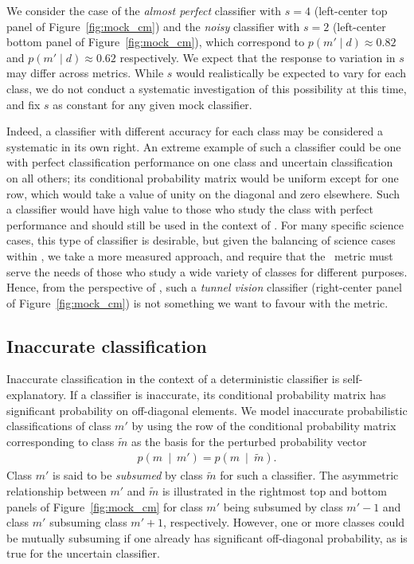 We consider the case of the \textit{almost perfect} classifier with $s=4$ (left-center top panel of Figure~\ref{fig:mock_cm}) and the \textit{noisy} classifier with $s=2$ (left-center bottom panel of Figure~\ref{fig:mock_cm}), which correspond to $p(m' \mid d)\approx0.82$ and $p(m' \mid d)\approx0.62$ respectively. We expect that the response to variation in $s$ may differ across metrics. While $s$ would realistically be expected to vary for each class, we do not conduct a systematic investigation of this possibility at this time, and fix $s$ as constant for any given mock classifier.

Indeed, a classifier with different accuracy for each class may be considered a systematic in its own right. An extreme example of such a classifier could be one with perfect classification performance on one class and uncertain classification on all others; its conditional probability matrix would be uniform except for one row, which would take a value of unity on the diagonal and zero elsewhere. Such a classifier would have high value to those who study the class with perfect performance and should still be used in the context of \lsst. For many specific science cases, this type of classifier is desirable, but given the balancing of science cases within \lsst, we take a more measured approach, and require that the \plasticc\ metric must serve the needs of those who study a wide variety of classes for different purposes. Hence, from the perspective of \plasticc, such a \textit{tunnel vision} classifier (right-center panel of Figure~\ref{fig:mock_cm}) is not something we want to favour with the metric.

\subsection{Inaccurate classification}
\label{sec:inaccuratedata}

Inaccurate classification in the context of a deterministic classifier is self-explanatory.
If a classifier is  inaccurate, its conditional probability matrix has significant probability on off-diagonal elements.
We model inaccurate probabilistic classifications of class $m'$ by using the row of the conditional probability matrix corresponding to class $\tilde{m}$ as the basis for the perturbed probability vector
\begin{eqnarray}
  \label{eq:subsume}
  p(m\ \mid\ m') = p(m\ \mid\ \tilde{m}).
\end{eqnarray}
Class $m'$ is said to be \textit{subsumed} by class $\tilde{m}$ for such a classifier.
The asymmetric relationship between $m'$ and $\tilde{m}$ is illustrated in the rightmost top and bottom panels of Figure~\ref{fig:mock_cm} for class $m'$ being subsumed by class $m'-1$ and class $m'$ subsuming class $m'+1$, respectively.
However, one or more classes could be mutually subsuming if one already has significant off-diagonal probability, as is true for the uncertain classifier.

